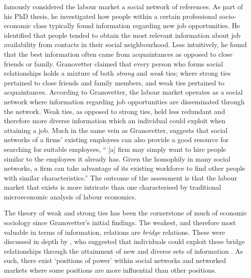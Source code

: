 \citet{Granovetter1973} famously considered the labour market a social network of references. As part of his PhD thesis, he investigated how people within a certain professional socio-economic class typically found information regarding new job opportunities. He identified that people tended to obtain the most relevant information about job availability from contacts in their social neighbourhood. Less intuitively, he found that the best information often came from acquaintances as opposed to close friends or family. Granovetter claimed that every person who forms social relationships holds a mixture of both \emph{strong} and \emph{weak} ties; where strong ties pertained to close friends and family members, and weak ties pertained to acquaintances. According to Granovetter, the labour market operates as a social network where information regarding job opportunities are disseminated through the network. Weak ties, as opposed to strong ties, held less redundant and therefore more diverse information which an individual could exploit when attaining a job. Much in the same vein as Granovetter, \citet[p.~333]{Jackson2008} suggests that social networks of a firms' existing employees can also provide a good resource for searching for suitable employees, `` [a] firm may simply want to hire people similar to the employees it already has. Given the homophily in many social networks, a firm can take advantage of its existing workforce to find other people with similar characteristics.'' The outcome of the assessment is that the labour market that exists is more intricate than one characterised by traditional microeconomic analysis of labour economics.

The theory of weak and strong ties has been the cornerstone of much of economic sociology since Granovetter's initial findings. The weakest, and therefore most valuable in terms of information, relations are \emph{bridge} relations. These were discussed in depth by \citet{Burt1992}, who suggested that individuals could exploit these bridge relationships through the attainment of new and diverse sets of information \citep{Burt2004}. As such, there exist `positions of power' within social networks and networked markets where some positions are more influential than other positions.

